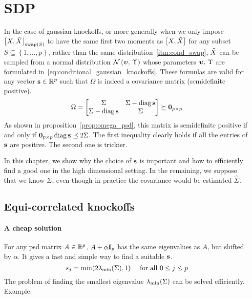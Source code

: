 \chapter{SDP}\label{ch:sdp}

In the case of gaussian knockoffs,
or more generally when we only impose
$\big[ X, \tilde{X} \big]_{\operatorname{swap}\left( S \right)}$
to have the same first two moments as
$\big[ X, \tilde{X} \big]$
for any subset
$S \subseteq \left\{ 1, \dots, p \right\}$,
rather than the same distribution~\ref{itm:cond_swap},
$\tilde{X}$ can be sampled from a normal distribution $\mathcal{N}\left( \bm{\upsilon},\, \Upsilon \right)$ whose parameters
$\bm{\upsilon},\, \Upsilon$ are formulated in~\ref{eq:conditional_gaussian_knockoffs}.
These formulas are valid for any vector $\mathbf{s} \in \mathbb{R}^p$ such that $\Omega$
is indeed a covariance matrix (semidefinite positive).
\begin{equation*}
    \Omega = \begin{bmatrix}
        \Sigma & \Sigma - \operatorname*{diag} \mathbf{s}\\
        \Sigma - \operatorname*{diag} \mathbf{s} & \Sigma
    \end{bmatrix}
    \succeq \mathbf{0}_{p \times p}
\end{equation*}
As shown in proposition~\ref{prop:omega_psd},
this matrix is semidefinite positive if and only if $\mathbf{0}_{p \times p} \operatorname*{diag} \mathbf{s} \preceq 2 \Sigma$.
The first inequality clearly holds if all the entries of $\mathbf{s}$ are positive.
The second one is trickier.

In this chapter, we show why the choice of $\mathbf{s}$ is important and how to efficiently find a good one
in the high dimensional setting.
In the remaining, we suppose that we know $\Sigma$, even though in practice the covariance would be
estimated $\hat{\Sigma}$.

\section{Equi-correlated knockoffs}\label{sec:equi}

\subsubsection{A cheap solution}

For any psd matrix $A \in \mathbb{R}^p$, $A + \alpha\mathbf{I}_p$ has the same eigenvalues as $A$, but shifted by $\alpha$.
It gives a fast and simple way to find a suitable $\mathbf{s}$.
\begin{equation*}
    s_j = \min(2\lambda_{\min}(\Sigma), 1)
    \quad\text{ for all } 0 \leq j \leq p
\end{equation*}
The problem of finding the smallest eigenvalue $\lambda_{\min}(\Sigma)$ can be solved efficiently.
Example.

